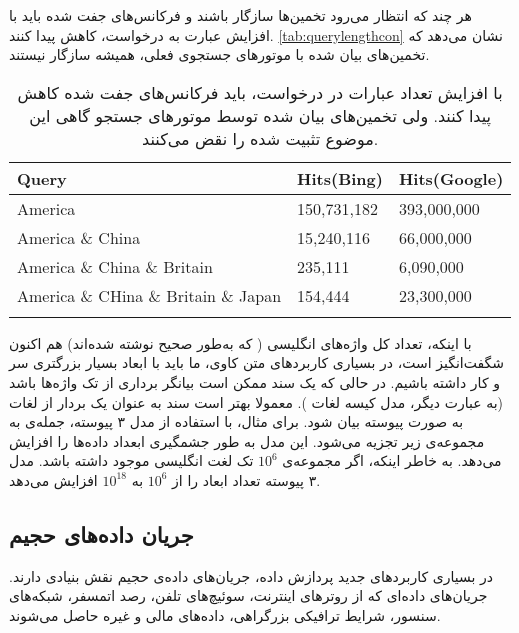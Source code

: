 هر چند که انتظار می‌رود تخمین‌ها سازگار باشند و فرکانس‌های جفت شده باید با افزایش عبارت به درخواست، کاهش پیدا کنند. 
\autoref{tab:querylengthcon}
نشان می‌دهد که تخمین‌های بیان شده با موتورهای جستجوی فعلی، همیشه سازگار نیستند.
\begin{table}[h]
\caption{
با افزایش تعداد عبارات در درخواست، باید فرکانس‌های جفت شده کاهش پیدا کنند. ولی تخمین‌های بیان شده توسط موتورهای جستجو گاهی این موضوع تثبیت شده را نقض می‌کنند.
}
\centering
\bigskip
\begin{latin}
\begin{tabular}{lll}
\hhline{===}
Query        				& Hits(Bing)    & Hits(Google) 	\\ \hline
America            			& 150,731,182 	& 393,000,000 	\\
America \& China          		& 15,240,116  	& 66,000,000 	\\
America \& China \& Britain     	& 235,111     	& 6,090,000     \\
America \& CHina \& Britain \& Japan 	& 154,444     	& 23,300,000    \\
\hhline{===}
\end{tabular}
\end{latin}
\label{tab:querylengthcon}
\end{table}

با اینکه، تعداد کل واژه‌های انگلیسی ( که به‌طور صحیح نوشته شده‌اند) هم اکنون شگفت‌انگیز است، در بسیاری کاربردهای متن کاوی، ما باید با ابعاد بسیار بزرگتری سر و کار داشته باشیم. در حالی که یک سند ممکن است بیانگر برداری از تک واژه‌ها باشد (به عبارت دیگر، مدل کیسه لغات%
%
). معمولا بهتر است سند به عنوان یک بردار از لغات به صورت 
پیوسته %
\cite{litez34}
بیان شود. برای مثال، با استفاده از مدل ۳ پیوسته، جمله‌ی
به مجموعه‌ی زیر تجزیه می‌شود. 
این مدل به طور جشمگیری ابعداد داده‌ها را افزایش می‌دهد. به خاطر اینکه، اگر مجموعه‌ی 
$10^6$
تک لغت انگلیسی موجود داشته باشد. مدل ۳ پیوسته تعداد ابعاد را از 
$10^6$
به 
$10^{18}$
افزایش می‌دهد.

\subsection{
جریان‌ داده‌‌های حجیم
}

در بسیاری کاربردهای جدید پردازش داده، جریان‌های داده‌ی حجیم نقش بنیادی دارند. جریان‌های داده‌ای که از روترهای اینترنت، سوئیچ‌های تلفن، رصد اتمسفر، شبکه‌های سنسور، شرایط ترافیکی بزرگراهی، داده‌های مالی و غیره 
\cite{litez5, litez141, litez49, litez19, litez96, litez69, litez91}
حاصل می‌شوند.


